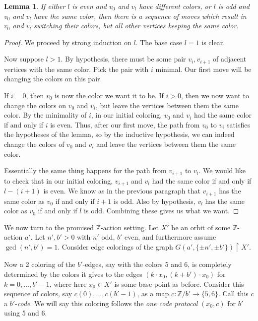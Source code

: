 \documentclass[12pt]{article}
\newcommand{\0}{\varnothing}
\newcommand{\Z}{\mathbb{Z}}
\newcommand{\res}{\upharpoonright}
\newtheorem{lemma}{Lemma}
\begin{document}
\begin{lemma}\label{lem:game}
If either $l$ is even and $v_0$ and $v_l$ have different colors, or $l$ is odd and $v_0$ and $v_l$ have the same color, then there is a sequence of moves which result in $v_0$ and $v_l$ switching their colors, but all other vertices keeping the same color.
\end{lemma}

\begin{proof}
We proceed by strong induction on $l$. The base case $l=1$ is clear. 

Now suppose $l > 1$. By hypothesis, there must be some pair $v_i,v_{i+1}$ of adjacent vertices with the same color. Pick the pair with $i$ minimal. Our first move will be changing the colors on this pair.

If $i = 0$, then $v_0$ is now the color we want it to be. If $i > 0$, then we now want to change the colors on $v_0$ and $v_i$, but leave the vertices between them the same color. By the minimality of $i$, in our initial coloring, $v_0$ and $v_i$ had the same color if and only if $i$ is even. Thus, after our first move, the path from $v_0$ to $v_i$ satisfies the hypotheses of the lemma, so by the inductive hypothesis,  we can indeed change the colors of $v_0$ and $v_i$ and leave the vertices between them the same color.

Essentially the same thing happens for the path from $v_{i+1}$ to $v_l$. We would like to check that in our initial coloring, $v_{i+1}$ and $v_l$ had the same color if and only if $l - (i+1)$ is even. We know as in the previous paragraph that $v_{i+1}$ has the same color as $v_0$ if and only if $i+1$ is odd. Also by hypothesis, $v_l$ has the same color as $v_0$ if and only if $l$ is odd. Combining these gives us what we want.
\end{proof}

We now turn to the promised $\Z$-action setting. Let $X'$ be an orbit of some $\Z$-action $a'$. Let $n',b' > 0$ with $n'$ odd, $b'$ even, and furthermore assume $\gcd(n',b') = 1$. Consider edge colorings of the graph $G(a',\{\pm n', \pm b' \}) \res X'$. 

Now a 2 coloring of the $b'$-edges, say with the colors 5 and 6, is completely determined by the colors it gives to the edges $(k \cdot x_0, (k+b') \cdot x_0)$ for $k=0,\ldots,b'-1$, where here $x_0 \in X'$ is some base point as before. Consider this sequence of colors, say $c(0),\ldots,c(b'-1)$, as a map $c: \Z/b' \rightarrow \{5,6\}$. Call this $c$ a $b'$-\textit{code}. We will say this coloring follows the \textit{one code protocol} $(x_0,c)$ for $b'$ using 5 and 6. 
\end{document}
